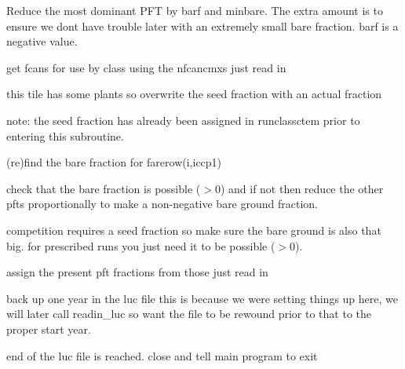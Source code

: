 Reduce the most dominant P\+F\+T by barf and minbare. The extra amount is to ensure we don\textquotesingle{}t have trouble later with an extremely small bare fraction. barf is a negative value.

get fcans for use by class using the nfcancmxs just read in

this tile has some plants so overwrite the seed fraction with an actual fraction

note\+: the seed fraction has already been assigned in runclassctem prior to entering this subroutine.

(re)find the bare fraction for farerow(i,iccp1)

check that the bare fraction is possible ($>$0) and if not then reduce the other pfts proportionally to make a non-\/negative bare ground fraction.

competition requires a \textquotesingle{}seed\textquotesingle{} fraction so make sure the bare ground is also that big. for prescribed runs you just need it to be possible ($>$0).

assign the present pft fractions from those just read in

back up one year in the luc file this is because we were setting things up here, we will later call readin\+\_\+luc so want the file to be rewound prior to that to the proper start year.

end of the luc file is reached. close and tell main program to exit 